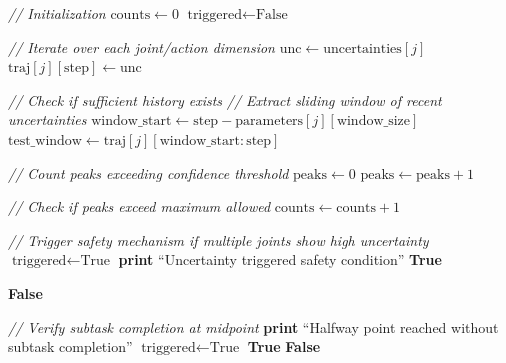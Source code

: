 \begin{algorithm}[t]
\caption{Uncertainty-Based Switching Logic for Safe Robot Manipulation}
\label{alg:switching_logic}
\begin{algorithmic}[1]
    \State \textit{// Initialization}
    \State $\text{counts} \gets 0$
    \State $\text{triggered} \gets \text{False}$
    
    \State \textit{// Iterate over each joint/action dimension}
        \State $\text{unc} \gets \text{uncertainties}[j]$
        \State $\text{traj}[j][\text{step}] \gets \text{unc}$
        
        \State \textit{// Check if sufficient history exists}
            \State \textit{// Extract sliding window of recent uncertainties}
            \State $\text{window\_start} \gets \text{step} - \text{parameters}[j][\text{window\_size}]$
            \State $\text{test\_window} \gets \text{traj}[j][\text{window\_start} : \text{step}]$
            
            \State \textit{// Count peaks exceeding confidence threshold}
            \State $\text{peaks} \gets 0$
                    \State $\text{peaks} \gets \text{peaks} + 1$
                \EndIf
            \EndFor
            
            \State \textit{// Check if peaks exceed maximum allowed}
                \State $\text{counts} \gets \text{counts} + 1$
            \EndIf
        \EndIf
    \EndFor
    
    \State \textit{// Trigger safety mechanism if multiple joints show high uncertainty}
            \State $\text{triggered} \gets \text{True}$
            \State \textbf{print} ``Uncertainty triggered safety condition''
        \EndIf
        \State \Return \textbf{True} 
    \EndIf
    
    \State \Return \textbf{False} 
\EndProcedure

\State

    \State \textit{// Verify subtask completion at midpoint}
            \State \textbf{print} ``Halfway point reached without subtask completion''
            \State $\text{triggered} \gets \text{True}$
        \EndIf
        \State \Return \textbf{True} 
    \EndIf
    \State \Return \textbf{False}
\EndProcedure
\end{algorithmic}
\end{algorithm}
